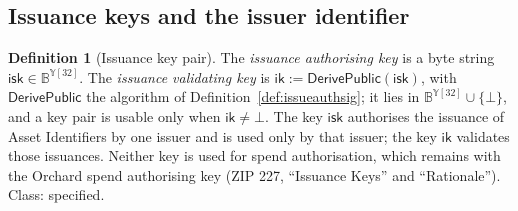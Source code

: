 \documentclass[11pt,a4paper]{article}
\theoremstyle{definition}
\newtheorem{definition}[theorem]{Definition}
\begin{document}
\subsection{Issuance keys and the issuer identifier}\label{sec:asset-keys}

\begin{definition}[Issuance key pair]\label{def:issuance-keys}
The \emph{issuance authorising key} is a byte string
$\mathsf{isk} \in \mathbb{B}^{\mathbb{Y}[32]}$. The \emph{issuance
validating key} is $\mathsf{ik} := \mathsf{DerivePublic}(\mathsf{isk})$,
with $\mathsf{DerivePublic}$ the algorithm of
Definition~\ref{def:issueauthsig}; it lies in
$\mathbb{B}^{\mathbb{Y}[32]} \cup \{\bot\}$, and a key pair is usable only
when $\mathsf{ik} \neq \bot$. The key $\mathsf{isk}$ authorises the issuance
of Asset Identifiers by one issuer and is used only by that issuer; the key
$\mathsf{ik}$ validates those issuances. Neither key is used for spend
authorisation, which remains with the Orchard spend authorising key (ZIP
227, ``Issuance Keys'' and ``Rationale''). Class: specified.
\end{definition}
\end{document}
